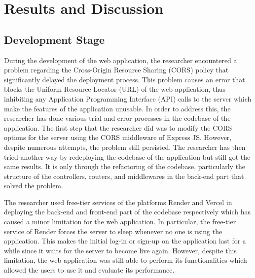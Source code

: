 \documentclass[journal]{./IEEE/IEEEtran}
\begin{document}
\section{Results and Discussion}

\subsection{Development Stage}
During the development of the web application, the researcher encountered a problem regarding the Cross-Origin Resource Sharing (CORS) policy that significantly delayed the deployment process. This problem causes an error that blocks the Uniform Resource Locator (URL) of the web application, thus inhibiting any Application Programming Interface (API) calls to the server which make the features of the application unusable. In order to address this, the researcher has done various trial and error processes in the codebase of the application. The first step that the researcher did was to modify the CORS options for the server using the CORS middleware of Express JS. However, despite numerous attempts, the problem still persisted. The researcher has then tried another way by redeploying the codebase of the application but still got the same results. It is only through the refactoring of the codebase, particularly the structure of the  controllers, routers, and middlewares in the back-end part that solved the problem.

The researcher used free-tier services of the platforms Render and Vercel in deploying the back-end and front-end part of the codebase respectively which has caused a minor limitation for the web application. In particular, the free-tier service of Render forces the server to sleep whenever no one is using the application. This makes the initial log-in or sign-up on the application last for a while since it waits for the server to become live again. However, despite this limitation, the web application was still able to perform its functionalities which allowed the users to use it and evaluate its performance. 
\end{document}
